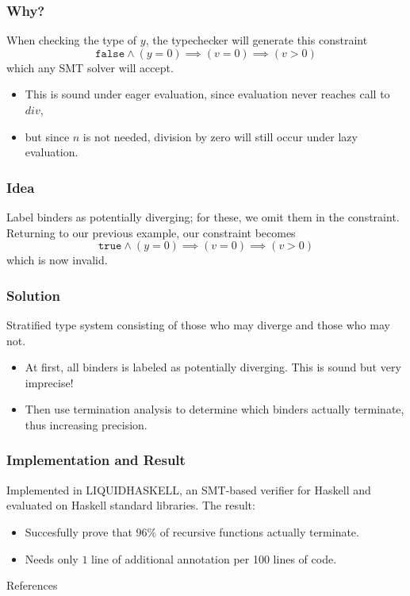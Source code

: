 \documentclass[pdf]{beamer}
\begin{document}
\begin{frame}
  \frametitle{Why?}
  When checking the type of $y$, the typechecker will generate this constraint
  $$\mathtt{false}\wedge(y=0)\implies(v=0)\implies(v>0)$$
  which any SMT solver will accept.
  \begin{itemize}
    \item This is sound under eager evaluation, since evaluation never reaches call to $div$,
    \item but since $n$ is not needed, division by zero will still occur under lazy evaluation.
  \end{itemize}
\end{frame}

\begin{frame}
  \frametitle{Idea}
  Label binders as potentially diverging; for these, we omit them in the
  constraint.  Returning to our previous example, our constraint becomes
  $$\mathtt{true}\wedge(y=0)\implies(v=0)\implies(v>0)$$
  which is now invalid.
\end{frame}

\begin{frame}
  \frametitle{Solution}
  Stratified type system consisting of those who may diverge and those who may not.
  \begin{itemize}
    \item At first, all binders is labeled as potentially diverging.  This is
      sound but very imprecise!
    \item Then use termination analysis to determine which binders actually
      terminate, thus increasing precision.
  \end{itemize}
\end{frame}

\begin{frame}
  \frametitle{Implementation and Result}
  Implemented in LIQUIDHASKELL, an SMT-based verifier for Haskell and evaluated
  on Haskell standard libraries.  The result:
  \begin{itemize}
    \item Succesfully prove that $96\%$ of recursive functions actually terminate.
    \item Needs only $1$ line of additional annotation per 100 lines of code.
  \end{itemize}
\end{frame}

\begin{frame}{References}
  
  
  \nocite{Rondon:2008:LT,Xi:1998:EAB,DBLP:conf/focs/HopcroftPV75}
\end{frame}
\end{document}

